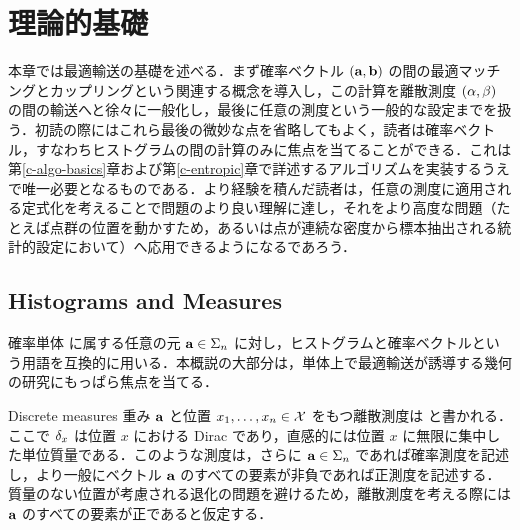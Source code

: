 
\chapter{理論的基礎}
\label{c-continuous}

本章では最適輸送の基礎を述べる．まず確率ベクトル $(\mathrm{\textbf{a}},\mathrm{\textbf{b}})$ の間の最適マッチングとカップリングという関連する概念を導入し，この計算を離散測度 $(\alpha,\beta)$ の間の輸送へと徐々に一般化し，最後に任意の測度という一般的な設定までを扱う．初読の際にはこれら最後の微妙な点を省略してもよく，読者は確率ベクトル，すなわちヒストグラムの間の計算のみに焦点を当てることができる．これは第\ref{c-algo-basics}章および第\ref{c-entropic}章で詳述するアルゴリズムを実装するうえで唯一必要となるものである．より経験を積んだ読者は，任意の測度に適用される定式化を考えることで問題のより良い理解に達し，それをより高度な問題（たとえば点群の位置を動かすため，あるいは点が連続な密度から標本抽出される統計的設定において）へ応用できるようになるであろう．

\section{Histograms and Measures}

確率単体
に属する任意の元 $\mathrm{\textbf{a}} \in \Sigma_n$ に対し，ヒストグラムと確率ベクトルという用語を互換的に用いる．本概説の大部分は，単体上で最適輸送が誘導する幾何の研究にもっぱら焦点を当てる．%


\begin{rem1}{Discrete measures}
重み $\mathrm{\textbf{a}}$ と位置 $x_1,\dots,x_n\in\mathcal{X}$ をもつ離散測度は
と書かれる．ここで $\delta_x$ は位置 $x$ における Dirac であり，直感的には位置 $x$ に無限に集中した単位質量である．このような測度は，さらに $\mathrm{\textbf{a}}\in\Sigma_n$ であれば確率測度を記述し，より一般にベクトル $\mathrm{\textbf{a}}$ のすべての要素が非負であれば正測度を記述する．質量のない位置が考慮される退化の問題を避けるため，離散測度を考える際には $\mathrm{\textbf{a}}$ のすべての要素が正であると仮定する．
\end{rem1}



